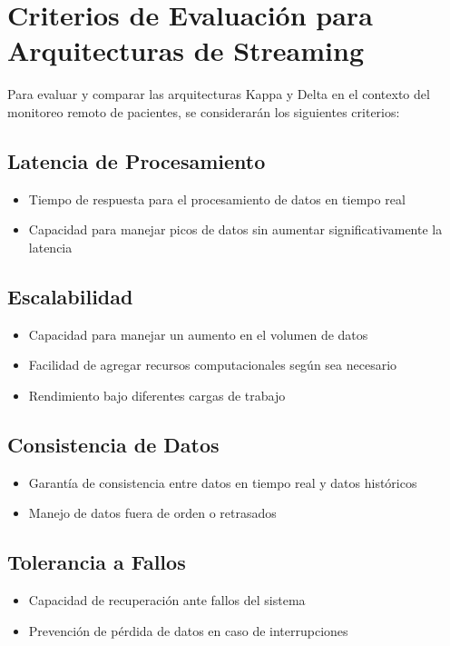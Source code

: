 \section{Criterios de Evaluación para Arquitecturas de Streaming}

Para evaluar y comparar las arquitecturas Kappa y Delta en el contexto del monitoreo remoto de pacientes, se considerarán los siguientes criterios:

\subsection{Latencia de Procesamiento}
\begin{itemize}
    \item Tiempo de respuesta para el procesamiento de datos en tiempo real
    \item Capacidad para manejar picos de datos sin aumentar significativamente la latencia
\end{itemize}

\subsection{Escalabilidad}
\begin{itemize}
    \item Capacidad para manejar un aumento en el volumen de datos
    \item Facilidad de agregar recursos computacionales según sea necesario
    \item Rendimiento bajo diferentes cargas de trabajo
\end{itemize}

\subsection{Consistencia de Datos}
\begin{itemize}
    \item Garantía de consistencia entre datos en tiempo real y datos históricos
    \item Manejo de datos fuera de orden o retrasados
\end{itemize}

\subsection{Tolerancia a Fallos}
\begin{itemize}
    \item Capacidad de recuperación ante fallos del sistema
    \item Prevención de pérdida de datos en caso de interrupciones
\end{itemize}

